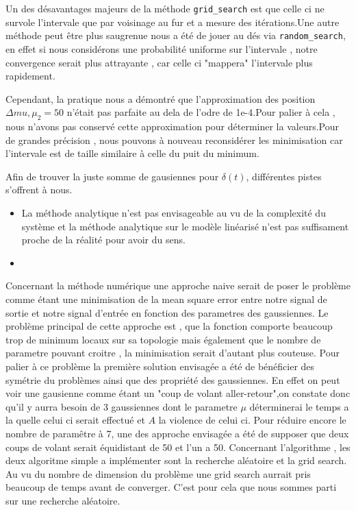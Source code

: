 \documentclass[11pt,a4paper]{article}
\begin{document}
 \par Un des désavantages majeurs de la méthode \texttt{grid\_search} est que celle ci ne survole l'intervale que par voisinage au fur et a mesure des itérations.Une autre méthode peut être plus saugrenue nous a été de jouer au dés via \texttt{random\_search}, en effet si nous considérons une probabilité uniforme sur l'intervale , notre convergence serait plus attrayante , car celle ci "mappera" l'intervale plus rapidement.

\par Cependant, la pratique nous a démontré que l'approximation des position $\Delta mu, \mu_2=50$ n'était pas parfaite au dela de l'odre de 1e-4.Pour palier à cela , nous n'avons pas conservé cette approximation pour déterminer la valeurs.Pour de grandes précision , nous pouvons à nouveau reconsidérer les minimisation car l'intervale est de taille similaire à celle du puit du minimum.


Afin de trouver la juste somme de gausiennes pour $\delta(t)$, différentes pistes s'offrent à nous.
\begin{itemize}
  \item 
La méthode analytique n'est pas envisageable au vu de la complexité du système et la méthode analytique sur le modèle linéarisé n'est pas suffisament proche de la réalité pour avoir du sens. 
\item 
\end{itemize}
Concernant la méthode numérique une approche naive serait de poser le problème comme étant une minimisation de la mean square error entre notre signal de sortie et notre signal d'entrée en fonction des parametres des gaussiennes. 
Le problème principal de cette approche est , que la fonction comporte beaucoup trop de minimum locaux sur sa topologie mais également que le nombre de parametre pouvant croitre , la minimisation serait d'autant plus couteuse. 
Pour palier à ce problème la première solution envisagée a été de bénéficier des symétrie du problèmes ainsi que des propriété des gaussiennes.
En effet on peut voir une gausienne comme étant un "coup de volant aller-retour",on constate donc qu'il y aurra besoin de 3 gaussiennes dont le parametre $\mu$ déterminerai le temps a la quelle celui ci serait effectué et $A$ la violence de celui ci. 
Pour réduire encore le nombre de paramêtre à 7, une des approche envisagée a été de supposer que deux coups de volant serait équidistant de 50 et l'un a 50. Concernant l'algorithme , les deux algoritme simple a implémenter sont la recherche aléatoire et la grid search. Au vu du nombre de dimension du problème une grid search aurrait pris beaucoup de temps avant de converger. C'est pour cela que nous sommes parti sur une recherche aléatoire. 
\end{document}
